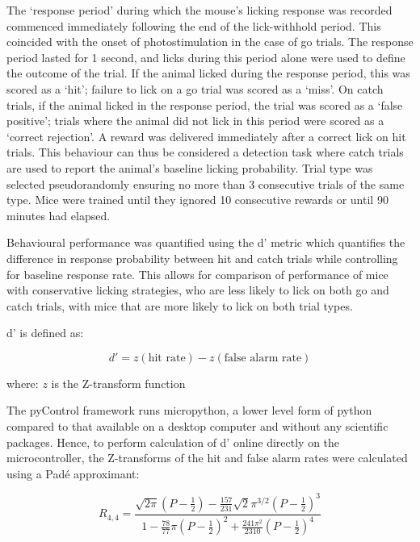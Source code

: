 The `response period' during which the mouse's licking response was recorded commenced immediately following the end of the lick-withhold period. This coincided with the onset of photostimulation in the case of go trials. The response period lasted for 1 second, and licks during this period alone were used to define the outcome of the trial. If the animal licked during the response period, this was scored as a `hit'; failure to lick on a go trial was scored as a `miss'. On catch trials, if the animal licked in the response period, the trial was scored as a `false positive'; trials where the animal did not lick in this period were scored as a `correct rejection'. A reward was delivered immediately after a correct lick on hit trials. This behaviour can thus be considered a detection task where catch trials are used to report the animal's baseline licking probability. Trial type was selected pseudorandomly ensuring no more than 3 consecutive trials of the same type. Mice were trained until they ignored 10 consecutive rewards or until 90 minutes had elapsed.

Behavioural performance was quantified using the d' metric \cite{brophy_alternatives_1986} which quantifies the difference in response probability between hit and catch trials while controlling for baseline response rate. This allows for comparison of performance of mice with conservative licking strategies, who are less likely to lick on both go and catch trials, with mice that are more likely to lick on both trial types.

d' is defined as:

\begin{equation}
d' = z(\text{hit rate}) - z(\text{false alarm rate})
\end{equation}

where: $z$ is the Z-transform function

The pyControl framework runs micropython, a lower level form of python compared to that available on a desktop computer and without any scientific packages. Hence, to perform calculation of d' online directly on the microcontroller, the Z-transforms of the hit and false alarm rates were calculated using a Pad\'e approximant:

\begin{equation} \label{eq:pade}
 R_{4,4} = \frac{\sqrt{2\pi}(P - \frac{1}{2}) - \frac{157}{231}\sqrt{2}\pi^{3/2}(P - \frac{1}{2})^{3}}{1-\frac{78}{77}\pi(P-\frac{1}{2})^{2} + \frac{241\pi^{2}}{2310}(P - \frac{1}{2})^{4}}
\end{equation}

